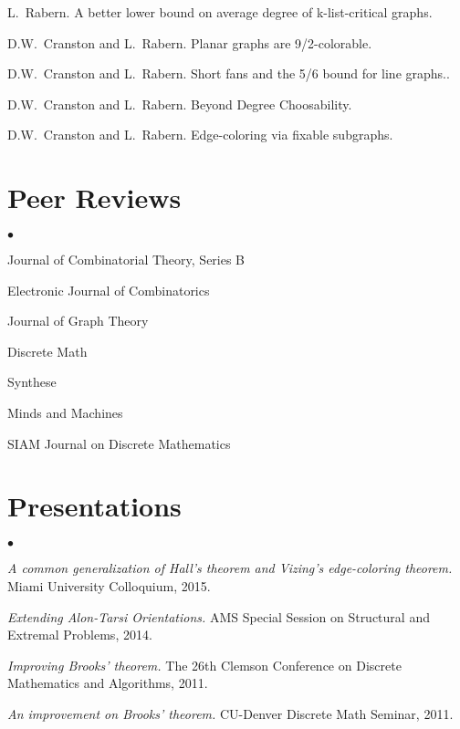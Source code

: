 \documentclass[margin,line]{res}
\newenvironment{list2}{
  \begin{list}{$\bullet$}{%
      \setlength{\itemsep}{0in}
      \setlength{\parsep}{0in} \setlength{\parskip}{0in}
      \setlength{\topsep}{0in} \setlength{\partopsep}{0in} 
      \setlength{\leftmargin}{0.2in}}}{\end{list}}
\begin{document}
\begin{resume}
\begin{enumerate}[{[}1{]}]
\setcounter{enumi}{31}


\item
L.~Rabern.
\newblock A better lower bound on average degree of k-list-critical graphs.

\smallskip

\item
D.W.~Cranston and L.~Rabern.
\newblock Planar graphs are 9/2-colorable.

\smallskip

\item
D.W.~Cranston and L.~Rabern.
\newblock Short fans and the 5/6 bound for line graphs..

\smallskip

\item
D.W.~Cranston and L.~Rabern.
\newblock Beyond Degree Choosability.

\smallskip

\item
D.W.~Cranston and L.~Rabern.
\newblock Edge-coloring via fixable subgraphs.


\end{enumerate}

\section{\sc Peer Reviews}
\begin{list2}
\item Journal of Combinatorial Theory, Series B
\item Electronic Journal of Combinatorics
\item Journal of Graph Theory
\item Discrete Math
\item Synthese
\item Minds and Machines
\item SIAM Journal on Discrete Mathematics
\end{list2}

\section{\sc Presentations}
\begin{list2}
\item \emph{A common generalization of Hall's theorem and Vizing's edge-coloring theorem.} Miami University Colloquium, 2015.
\item \emph{Extending Alon-Tarsi Orientations.} AMS Special Session on Structural and Extremal Problems, 2014.
\item \emph{Improving Brooks' theorem.} The 26th Clemson Conference on Discrete Mathematics and Algorithms, 2011.
\item \emph{An improvement on Brooks' theorem.} CU-Denver Discrete Math Seminar, 2011.
\end{list2}


\end{resume}
\end{document}
